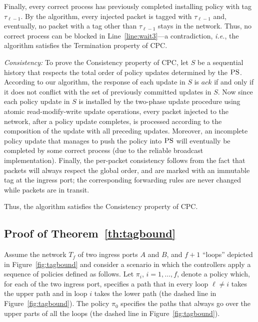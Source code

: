 \documentclass[11pt,pdftex,letter]{article}
\newcommand{\PS}{\textsc{PS}}
\newcommand{\ie}{{\it i.e.}}
\newcommand{\ack}{\textit{ack}}
\begin{document}
\begin{appendix}
Finally, every correct process has previously completed installing
policy with tag $\tau_{\ell-1}$.
By the algorithm, every injected packet is tagged with $\tau_{\ell-1}$ and,
 eventually, no packet with a tag other
than $\tau_{\ell-1}$ stays in the network.
Thus, no  correct process can be blocked
in Line~\ref{line:wait3}---a contradiction, \ie, the algorithm
satisfies the Termination property of CPC.

\emph{Consistency:} To prove the Consistency property of CPC,  let $S$ be a sequential
history that respects the total order of policy updates determined by
the $\PS$. According to our algorithm, the response of each update in
$S$ is $\ack$ if and only if it does not conflict with the set of
previously committed updates in $S$.
Now since each policy update in $S$ is installed by the two-phase
update procedure using atomic read-modify-write update operations,
every packet injected to the network, after a policy update
completes, is processed according to the composition of
the update with all preceding updates.
Moreover, an incomplete policy update that manages to push the policy
into $\PS$ will eventually be completed by some correct process (due to the reliable broadcast implementation).
Finally, the per-packet consistency follows from the fact that packets will always respect
the global order, and are marked with an immutable
tag at the ingress port; the corresponding forwarding rules are never changed while packets are
in transit.

Thus, the algorithm satisfies the Consistency property of CPC.



\subsection{Proof of Theorem~\ref{th:tagbound}}
\label{app:proof:dpo}

Assume the network $T_f$ of two ingress ports $A$ and $B$, and $f+1$
``loops'' depicted in Figure~\ref{fig:tagbound} and consider a
scenario in which the controllers apply a sequence of policies defined
as follows.
Let $\pi_i$, $i=1,\ldots,f$, denote a policy
which, for each of the two ingress port,  specifies a path that in
every loop $\ell\neq i$ takes the upper path and in loop $i$ takes the
lower path (the dashed line in Figure~\ref{fig:tagbound}).
The policy $\pi_0$ specifies the paths that always go over the upper parts
of all the loops (the dashed line in Figure~\ref{fig:tagbound}).


\end{appendix}
\end{document}
